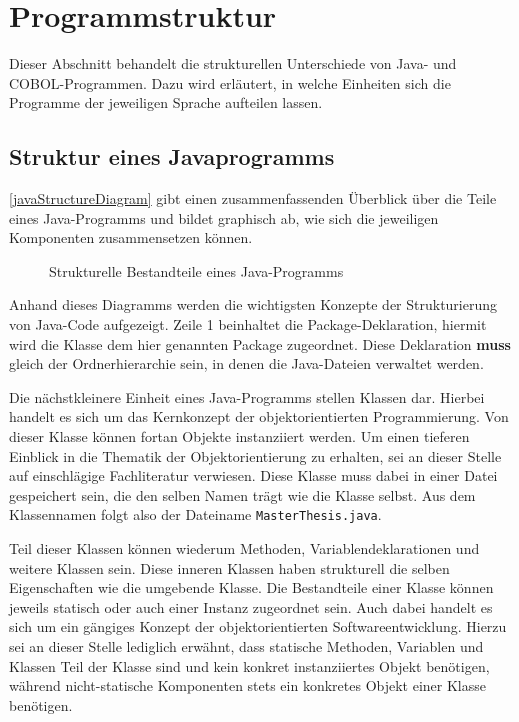 \section{Programmstruktur}\label{sec:structure}
Dieser Abschnitt behandelt die strukturellen Unterschiede von Java- und COBOL-Programmen. Dazu wird erläutert, in welche Einheiten sich die Programme der jeweiligen Sprache aufteilen lassen. 

\subsection*{Struktur eines Javaprogramms}
\autoref{javaStructureDiagram} gibt einen zusammenfassenden Überblick über die Teile eines Java-Programms und bildet graphisch ab, wie sich die jeweiligen Komponenten zusammensetzen können.

\begin{figure}[H]
    \centering
    \resizebox{.9\linewidth}{!}{\unskip}
    \caption{Strukturelle Bestandteile eines Java-Programms \label{javaStructureDiagram}}
\end{figure}

Anhand dieses Diagramms werden die wichtigsten Konzepte der Strukturierung von Java-Code aufgezeigt. Zeile 1 beinhaltet die Package-Deklaration, \dahe hiermit wird die Klasse dem hier genannten Package zugeordnet. Diese Deklaration \textbf{muss} gleich der Ordnerhierarchie sein, in denen die Java-Dateien verwaltet werden. 

Die nächstkleinere Einheit eines Java-Programms stellen Klassen dar. Hierbei handelt es sich um das Kernkonzept der objektorientierten Programmierung. Von dieser Klasse können fortan Objekte instanziiert werden. Um einen tieferen Einblick in die Thematik der Objektorientierung zu erhalten, sei an dieser Stelle auf einschlägige Fachliteratur verwiesen. Diese Klasse muss dabei in einer Datei gespeichert sein, die den selben Namen trägt wie die Klasse selbst. Aus dem Klassennamen  folgt also der Dateiname \texttt{MasterThesis.java}.

Teil dieser Klassen können wiederum Methoden, Variablendeklarationen und weitere Klassen sein. Diese inneren Klassen haben strukturell die selben Eigenschaften wie die umgebende Klasse. Die Bestandteile einer Klasse können jeweils statisch oder auch einer Instanz zugeordnet sein. Auch dabei handelt es sich um ein gängiges Konzept der objektorientierten Softwareentwicklung. Hierzu sei an dieser Stelle lediglich erwähnt, dass statische Methoden, Variablen und Klassen Teil der Klasse sind und kein konkret instanziiertes Objekt benötigen, während nicht-statische Komponenten stets ein konkretes Objekt einer Klasse benötigen. 

